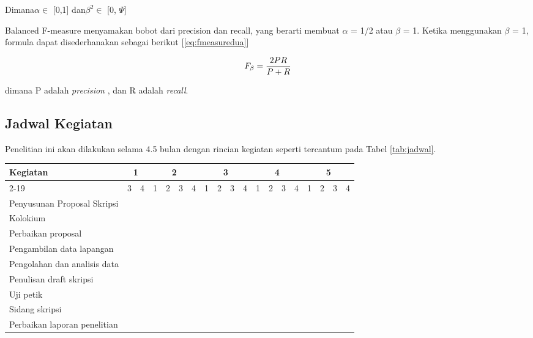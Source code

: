 Dimana$  \alpha \in $ [0,1] dan$  \beta^2 \in $ [0, $ \Psi $]

Balanced F-measure menyamakan bobot dari precision dan recall, yang berarti membuat $ \alpha $ = 1/2 atau $ \beta $ = 1. Ketika menggunakan $ \beta $ = 1, formula dapat disederhanakan sebagai berikut  [\ref{eq:fmeasuredua}]

\begin{equation}
	\begin{split}
		\tiny
		F_\beta = \frac{2PR}{P + R}
		\label{eq:fmeasuredua}
		\normalsize
	\end{split}
\end{equation}

dimana P adalah \textit{precision} , dan R adalah \textit{recall}.


\subsection*{Jadwal Kegiatan}
Penelitian ini akan dilakukan selama 4.5 bulan dengan rincian kegiatan seperti tercantum pada Tabel \ref{tab:jadwal}.
\begin{table*}[t!]
	\begin{center}
		\caption{Rencana Jadwal Penelitian}
		\label{tab:jadwal}
		\footnotesize
		\begin{tabular}{|l|c|c|c|c|c|c|c|c|c|c|c|c|c|c|c|c|c|c|}
			\hline
			\multirow{2}{*}{Kegiatan}&\multicolumn{2}{c|}{1}&\multicolumn{4}{c|}{2}&\multicolumn{4}{c|}{3}&\multicolumn{4}{c|}{4}&\multicolumn{4}{c|}{5}\\
			\cline{2-19}
			&3&4&1&2&3&4&1&2&3&4&1&2&3&4&1&2&3&4\\
			\hline
			Penyusunan Proposal Skripsi&\cellcolor{black}&\cellcolor{black}&\cellcolor{black}&\cellcolor{black}&&&&&&&&&&&&&&\\
			\hline
			Kolokium&&&&&\cellcolor{black}&&&&&&&&&&&&&\\
			\hline
			Perbaikan proposal&&&&&&\cellcolor{black}&&&&&&&&&&&&\\
			\hline
			Pengambilan data lapangan&&&&&&\cellcolor{black}&\cellcolor{black}&\cellcolor{black}&&&&&&&&&&\\
			\hline
			Pengolahan dan analisis data&&&&&&&&\cellcolor{black}&\cellcolor{black}&\cellcolor{black}&\cellcolor{black}&&&&&&&\\
			\hline
			Penulisan draft skripsi&&&&&&&&&&&&\cellcolor{black}&\cellcolor{black}&\cellcolor{black}&\cellcolor{black}&&&\\
			\hline
			Uji petik&&&&&&&&&&&&&&&&\cellcolor{black}&&\\
			\hline
			Sidang skripsi&&&&&&&&&&&&&&&&&\cellcolor{black}&\\
			\hline
			Perbaikan laporan penelitian&&&&&&&&&&&&&&&&&&\cellcolor{black}\\
			\hline
		\end{tabular}
		\normalsize
	\end{center}
\end{table*}